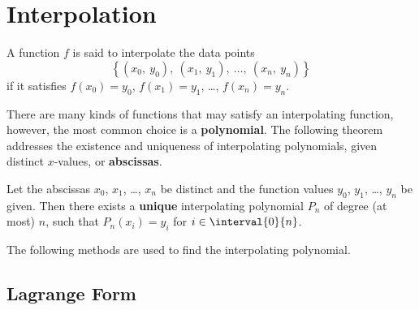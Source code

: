 \documentclass{article}
\begin{document}
\section{Interpolation}
\begin{definition}
    A function \(f\) is said to interpolate the data points
    \begin{equation*}
        \left\{ \left( x_0,\: y_0 \right),\: \left( x_1,\: y_1 \right),\: \dots,\: \left( x_n,\: y_n \right) \right\}
    \end{equation*}
    if it satisfies \(f\left( x_0 \right) = y_0\), \(f\left( x_1 \right) = y_1\), \dots,  \(f\left( x_n \right) = y_n\).
\end{definition}
There are many kinds of functions that may satisfy an interpolating
function, however, the most common choice is a
\textbf{polynomial}.
The following theorem addresses the existence and uniqueness of
interpolating polynomials, given distinct \(x\)-values, or
\textbf{abscissas}.
\begin{theorem}
    Let the abscissas \(x_0\), \(x_1\), \dots, \(x_n\) be distinct and
    the function values \(y_0\), \(y_1\), \dots, \(y_n\) be given. Then
    there exists a \textbf{unique} interpolating polynomial \(P_n\) of
    degree (at most) \(n\), such that \(P_n\left( x_i \right) = y_i\)
    for \(i \in \interval{0}{n}\).
\end{theorem}
The following methods are used to find the interpolating polynomial.
\subsection{Lagrange Form}
\end{document}
